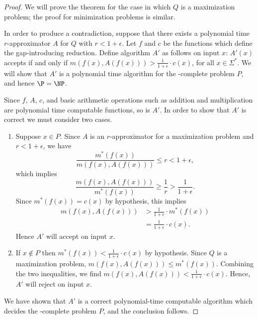 \documentclass[]{article}
\theoremstyle{plain}
\theoremstyle{definition}
\begin{document}
\begin{proof}
  We will prove the theorem for the case in which $Q$ is a maximization problem; the proof for minimization problems is similar.

  In order to produce a contradiction, suppose that there exists a polynomial time $r$-approximator $A$ for $Q$ with $r < 1 + \epsilon$.
  Let $f$ and $c$ be the functions which define the gap-introducing reduction.
  Define algorithm $A'$ as follows on input $x$: $A'(x)$ accepts if and only if $m(f(x), A(f(x))) > \frac{1}{1 + \epsilon} \cdot c(x)$, for all $x\in\Sigma^*$.
  We will show that $A'$ is a polynomial time algorithm for the \NP-complete problem $P$, and hence $\P=\NP$.

  Since $f$, $A$, $c$, and basic arithmetic operations such as addition and multiplication are polynomial time computable functions, so is $A'$.
  In order to show that $A'$ is correct we must consider two cases.
  \begin{enumerate}
  \item
    Suppose $x \in P$.
    Since $A$ is an $r$-approximator for a maximization problem and $r < 1 + \epsilon$, we have
    \begin{displaymath}
      \frac{m^*(f(x))}{m(f(x), A(f(x)))} \leq r < 1 + \epsilon,
    \end{displaymath}
    which implies
    \begin{displaymath}
      \frac{m(f(x), A(f(x)))}{m^*(f(x))} \geq \frac{1}{r} > \frac{1}{1 + \epsilon}.
    \end{displaymath}
    Since $m^*(f(x)) = c(x)$ by hypothesis, this implies
    \begin{align*}
      m(f(x), A(f(x))) & > \frac{1}{1 + \epsilon} \cdot m^*(f(x)) \\
      & = \frac{1}{1 + \epsilon} \cdot c(x).
    \end{align*}
    Hence $A'$ will accept on input $x$.
  \item
    If $x \notin P$ then $m^*(f(x)) < \frac{1}{1 + \epsilon} \cdot c(x)$ by hypothesis.
    Since $Q$ is a maximization problem, $m(f(x), A(f(x))) \leq m^*(f(x))$.
    Combining the two inequalities, we find $m(f(x), A(f(x))) < \frac{1}{1 + \epsilon} \cdot c(x)$.
    Hence, $A'$ will reject on input $x$.
  \end{enumerate}
  We have shown that $A'$ is a correct polynomial-time computable algorithm which decides the \NP-complete problem $P$, and the conclusion follows.
\end{proof}
\end{document}
